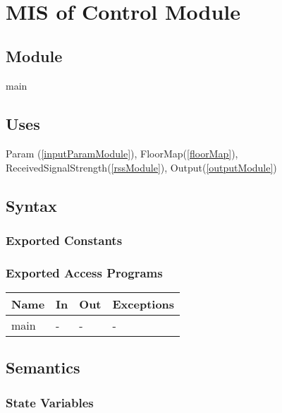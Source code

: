 \documentclass[12pt, titlepage]{article}
\begin{document}
\newpage
~\newpage

\section{MIS of Control Module} \label{controlModule}

\subsection{Module}

main

\subsection{Uses}

Param (\autoref{inputParamModule}), FloorMap(\autoref{floorMap}), ReceivedSignalStrength(\autoref{rssModule}), Output(\autoref{outputModule})

\subsection{Syntax}

\subsubsection{Exported Constants}

\subsubsection{Exported Access Programs}

\begin{center}
\begin{tabular}{p{2cm} p{4cm} p{4cm} p{2cm}}
\hline
\textbf{Name} & \textbf{In} & \textbf{Out} & \textbf{Exceptions} \\
\hline
main & - & - & - \\
\hline
\end{tabular}
\end{center}

\subsection{Semantics}

\subsubsection{State Variables}
\end{document}
